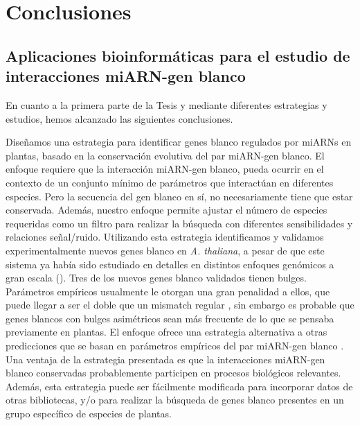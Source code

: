 \setcounter{chapter}{8}
\chapter*{Conclusiones} 
\setcounter{figure}{0}
\setcounter{table}{0}
\setcounter{section}{0}


\graphicspath{{Chapter2/Figs/}}


\section{Aplicaciones bioinformáticas para el estudio de interacciones miARN-gen blanco}

En cuanto a la primera parte de la Tesis y mediante diferentes estrategias y estudios, hemos alcanzado las siguientes conclusiones.

Diseñamos una estrategia para identificar genes blanco regulados por miARNs en plantas, basado en la conservación evolutiva del par miARN-gen blanco.
El enfoque requiere que la interacción miARN-gen blanco, pueda ocurrir en el contexto de un conjunto mínimo de parámetros que interactúan en diferentes especies. Pero la secuencia del gen blanco en sí, no necesariamente tiene que estar conservada.
Además, nuestro enfoque permite ajustar el número de especies requeridas como un filtro para realizar la búsqueda con diferentes sensibilidades y relaciones señal/ruido.
Utilizando esta estrategia identificamos y validamos experimentalmente nuevos genes blanco en \textit{A. thaliana}, a pesar de que este sistema ya había sido estudiado en detalles en distintos enfoques genómicos a gran escala (\citep{Allen2005207,JonesRhoades2004787,Addo-quaye2009a,German2008,Rajagopalan2006,Schwab2005517}).
Tres de los nuevos genes blanco validados tienen bulges. Parámetros empíricos usualmente le otorgan una gran penalidad a ellos, que puede llegar a ser el doble que un mismatch regular \citep{JonesRhoades2004787},  sin embargo es probable que genes blancos con bulges asimétricos sean más frecuente de lo que se pensaba previamente en plantas.
El enfoque ofrece una estrategia alternativa a otras predicciones que se basan en parámetros empíricos del par miARN-gen blanco \citep{Allen2005207,JonesRhoades2004787,citeulike:8816489,Fahlgren_chapter}.
Una ventaja de la estrategia presentada es que la interacciones miARN-gen blanco conservadas probablemente participen en procesos biológicos relevantes.
Además, esta estrategia puede ser fácilmente modificada para incorporar datos de otras bibliotecas, y/o para realizar la búsqueda de genes blanco presentes en un grupo específico de especies de plantas.

